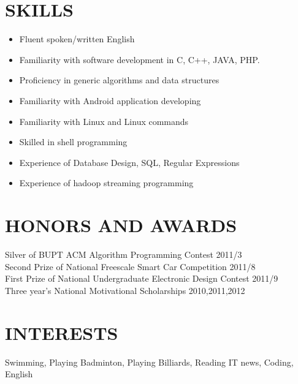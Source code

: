 \documentclass[a4paper]{res}
\begin{document}
\begin{resume}
{\begin{itemize}
 	\end{itemize}
 }

\section{SKILLS}
    \vspace{-0.05in}
    \hspace{-0.5in}{\rule{17.5cm}{0.02cm}}
    \begin{itemize}
        \item Fluent spoken/written English
    	\item Familiarity with software development in C, C++, JAVA, PHP.
		\item Proficiency in generic algorithms and data structures
	    \item Familiarity with Android application developing
		\item Familiarity with Linux and Linux commands
        \item Skilled in shell programming
        \item Experience of Database Design, SQL, Regular Expressions
		\item Experience of hadoop streaming programming	
    \end{itemize}

\section{HONORS AND AWARDS}
    \vspace{-0.05in}
    \hspace{-0.5in}{\rule{17.5cm}{0.02cm}}
    \normalsize
    Silver of BUPT ACM Algorithm Programming Contest \hfill 2011/3\\
Second Prize of National Freescale Smart Car Competition  \hfill 2011/8\\
First Prize of National Undergraduate Electronic Design Contest  \hfill 2011/9\\
Three year's National Motivational Scholarships \hfill 2010,2011,2012

\section{INTERESTS}
    \vspace{-0.05in}
    \hspace{-0.5in}{\rule{17.5cm}{0.02cm}}
    \vspace{0.05in}
    Swimming, Playing Badminton, Playing Billiards, Reading IT news, Coding, English
\end{resume}
\end{document}
